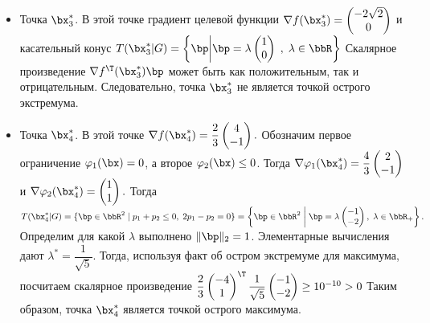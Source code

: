 \documentclass[12pt]{article}
\begin{document}
\begin{itemize}
\item Точка $\bx^*_3$. 
В этой точке градиент целевой функции $\nabla f(\bx^*_3) = 
\begin{pmatrix}
-2\sqrt{2}\\
0
\end{pmatrix}
$
и касательный конус $T(\bx^*_3|G) = \left \{ \bp \middle| \bp = \lambda 
\begin{pmatrix}
1\\
0
\end{pmatrix} \;
, \;
\lambda \in \bbR \right\}
$
Скалярное произведение $\nabla f^{\T}(\bx^*_3)\bp$ может быть как положительным, так и отрицательным.
Следовательно, точка $\bx^*_3$ не является точкой острого экстремума.
\item Точка $\bx^*_4$. В этой точке $\nabla f(\bx^*_4) = \dfrac{2}{3}
\begin{pmatrix}
4\\
-1
\end{pmatrix}.  
$
Обозначим первое ограничение $\varphi_1(\bx) = 0$, а второе $\varphi_2(\bx) \leq 0$.
Тогда $\nabla \varphi_1(\bx^*_4) = \dfrac{4}{3} 
\begin{pmatrix}
2\\
-1
\end{pmatrix}
$ и $\nabla \varphi_2(\bx^*_4) = 
\begin{pmatrix}
1\\
1
\end{pmatrix}.
$
Тогда $T(\bx^*_4|G) = \{\bp \in \bbR^2 \; | \; p_1 + p_2 \leq 0, \; 2p_1 - p_2 = 0 \} = \left \{ \bp \in \bbR^2 \; \middle| \; \bp = \lambda \begin{pmatrix}
-1\\
-2
\end{pmatrix}, \; \lambda \in \bbR_+ \right\}.$
Определим для какой $\lambda$ выполнено $\|\bp\|_2 = 1$.
Элементарные вычисления дают $\lambda^* = \dfrac{1}{\sqrt{5}}$.
Тогда, используя факт об остром экстремуме для максимума, посчитаем скалярное произведение $\dfrac{2}{3}
\begin{pmatrix}
-4\\
1
\end{pmatrix}^{\T}
\dfrac{1}{\sqrt{5}} 
\begin{pmatrix}
-1\\
-2
\end{pmatrix} \geq 10^{-10} > 0
$
Таким образом, точка $\bx^*_4$ является точкой острого максимума.
\end{itemize}
\end{document}

